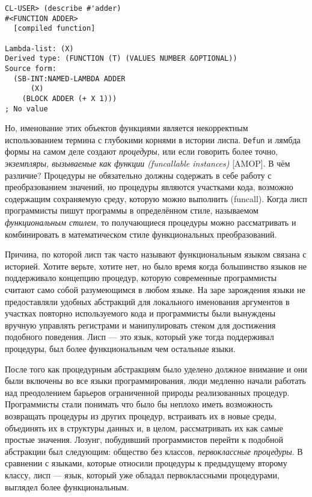 \begin{verbatim} 
CL-USER> (describe #'adder)
#<FUNCTION ADDER>
  [compiled function]

Lambda-list: (X)
Derived type: (FUNCTION (T) (VALUES NUMBER &OPTIONAL))
Source form:
  (SB-INT:NAMED-LAMBDA ADDER
      (X)
    (BLOCK ADDER (+ X 1)))
; No value
\end{verbatim}
 
Но, именование этих объектов функциями является некорректным использованием термина с глубокими корнями в истории лиспа. \verb"Defun" и лямбда формы на самом деле создают \emph{процедуры}, или если говорить более точно, \emph{экземпляры, вызываемые как функции (funcallable instances)} [AMOP]. В чём различие? Процедуры не обязательно должны содержать в себе работу с преобразованием значений, но процедуры являются участками кода, возможно содержащим сохраняемую среду, которую можно выполнить (funcall). Когда лисп программисты пишут программы в определённом стиле, называемом \emph{функциональным стилем}, то получающиеся процедуры можно рассматривать и комбинировать в математическом стиле функциональных преобразований. 
 
Причина, по которой лисп так часто называют функциональным языком связана с историей. Хотите верьте, хотите нет, но было время когда большинство языков не поддерживало концепцию процедур, которую современные программисты считают само собой разумеющимся в любом языке. На заре зарождения языки не предоставляли удобных абстракций для локального именования аргументов в участках повторно используемого кода и программисты были вынуждены вручную управлять регистрами и манипулировать стеком для достижения подобного поведения. Лисп --- это язык, который уже тогда поддерживал процедуры, был более функциональным чем остальные языки. 
 
После того как процедурным абстракциям было уделено должное внимание и они были включены во все языки программирования, люди медленно начали работать над преодолением барьеров ограниченной природы реализованных процедур. Программисты стали понимать что было бы неплохо иметь возможность возвращать процедуры из других процедур, встраивать их в новые среды, объединять их в структуры данных и, в целом, рассматривать их как самые простые значения. Лозунг, побудивший программистов перейти к подобной абстракции был следующим: общество без классов, \emph{первоклассные процедуры}. В сравнении с языками, которые относили процедуры к предыдущему второму классу, лисп --- язык, который уже обладал первоклассными процедурами, выглядел более функциональным. 
 
